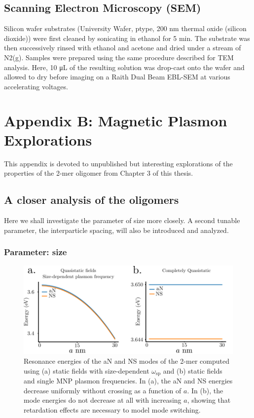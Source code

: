 \documentclass [11pt, proquest] {uwthesis}[2016/11/22]
\begin{document}
\section{Scanning Electron Microscopy (SEM)}

Silicon wafer substrates (University Wafer, ptype, 200 nm thermal oxide (silicon dioxide)) were first cleaned by sonicating in ethanol for 5 min. The substrate was then successively rinsed with ethanol and acetone and dried under a stream of N2(g). Samples were prepared using the same procedure described for TEM analysis. Here, 10 μL of the resulting solution was drop-cast onto the wafer and allowed to dry before imaging on a Raith Dual Beam EBL-SEM at various accelerating voltages.


\chapter{Appendix B: Magnetic Plasmon Explorations}

This appendix is devoted to unpublished but interesting explorations of the properties of the 2-mer oligomer from Chapter 3 of this thesis.

\section{A closer analysis of the oligomers}

Here we shall investigate the parameter of size more closely. A second tunable parameter, the interparticle spacing, will also be introduced and analyzed.

\subsection{Parameter: size}

\begin{figure}
\begin{centering}
\includegraphics{qs_limit.pdf}
\caption{Resonance energies of the aN and NS modes of the 2-mer computed using (a) static fields with size-dependent $\omega_{\textrm{sp}}$ and (b) static fields and single MNP plasmon frequencies. In (a), the aN and NS energies decrease uniformly without crossing as a function of $a$. In (b), the mode energies do not decrease at all with increasing $a$, showing that retardation effects are necessary to model mode switching.}
\label{qs_limit}
\end{centering}
\end{figure}
\end{document}
